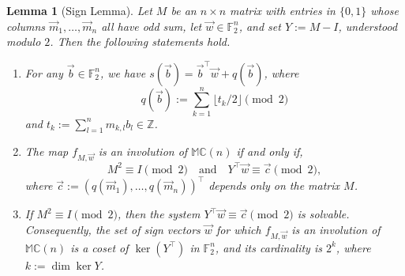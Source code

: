 \documentclass[12pt]{amsart}
\theoremstyle{plain}
\newtheorem{lemma}[theorem]{Lemma}
\theoremstyle{definition}
\numberwithin{equation}{section}
\newcommand{\mC}{\mathbb{C}}
\newcommand{\mM}{\mathbb{M}}
\begin{document}
    \begin{lemma}[Sign Lemma]\label{L:SignVectors}
    Let $M$ be an $n\times n$ matrix with entries in $\{0,1\}$ whose columns $\vec{m}_1,\ldots,\vec{m}_n$ all have odd sum, let $\vec w\in\mathbb F_2^n$, and set $Y:=M-I$, understood modulo $2$. Then the following statements hold.
        \begin{enumerate}[label=(\alph*)]
        \item For any $\vec b \in \mathbb F_2^n$, we have $s(\vec b)=\vec b^{\top}\vec w+q(\vec b)$, where
        \[
        q(\vec b):= \sum_{k = 1}^n \lfloor t_k / 2 \rfloor \pmod 2 
        \]
        and $t_k := \sum_{l = 1}^n m_{k, l} b_l \in \mathbb{Z}$.
                \item The map $f_{M, \vec{w}}$ is an involution of $\mM \mC(n)$ if and only if,
            \begin{equation}\label{Eq:AffineSign}
           M^2\equiv I\pmod 2
            \quad\text{and}\quad
            Y^{\top}\vec w\equiv \vec{c} \pmod 2,
            \end{equation}
        where $\vec c:=(q(\vec m_1),\ldots,q(\vec m_n))^\top$ depends only on the matrix $M$.
        \item If $M^2\equiv I\pmod 2$, then the system $Y^{\top}\vec w\equiv\vec c \pmod 2$ is solvable. Consequently, the set of sign vectors $\vec w$ for which $f_{M,\vec w}$ is an involution of $\mM \mC(n)$ is a coset of $\ker(Y^{\top})$ in $\mathbb F_2^n$, and its cardinality is $2^{k}$, where $k:=\dim\ker Y$.
        \end{enumerate}
    \end{lemma}
\end{document}
